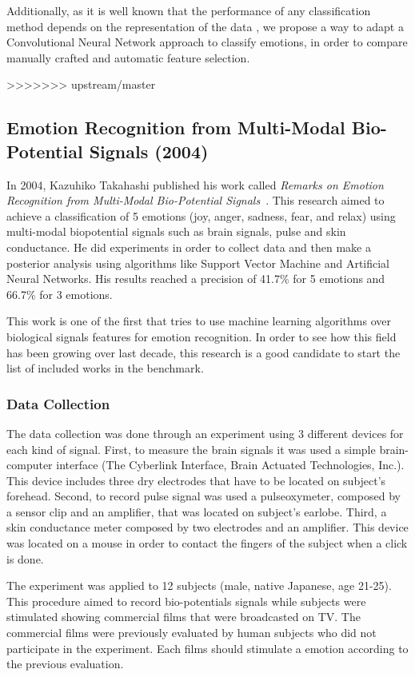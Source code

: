\documentclass{sig-alternate}
\begin{document}
Additionally, as it is well known that the performance of any 
classification method depends on the representation of the data 
\cite{bengio2013representation}, 
we propose a way to adapt a Convolutional Neural 
Network approach to classify emotions, in order to compare  manually
crafted and automatic feature selection. 

>>>>>>> upstream/master
\subsection{Emotion Recognition from Multi-Modal Bio-Potential Signals (2004)}	

In 2004, Kazuhiko Takahashi published his work called 
\textit{Remarks on Emotion Recognition from Multi-Modal Bio-Potential Signals}~\cite{takahashi2004}. This 
research aimed to achieve a classification of 5 emotions (joy, anger, sadness, fear, and relax)
using multi-modal biopotential signals such as brain signals, pulse and skin conductance. He
 did experiments in order to collect data and then make a posterior analysis using algorithms
 like Support Vector Machine and Artificial Neural Networks. His results reached a precision of
 41.7\% for 5 emotions and 66.7\% for 3 emotions. 

This work is one of the first that tries to use machine learning algorithms
 over biological signals features for emotion recognition. In order to see
 how this field has been growing over last decade, this research is a good
 candidate to start the list of included works in the benchmark.  

\subsubsection{Data Collection}

The data collection was done through an experiment using 3 different devices for each kind of signal. 
First, to measure the brain signals it was used a simple brain-computer interface
(The Cyberlink Interface, Brain Actuated Technologies, Inc.). This device includes 
three dry electrodes that have to be located on subject's forehead. Second, to record 
pulse signal was used a pulseoxymeter, composed by a sensor clip and an amplifier, that 
was located on subject's earlobe. Third, a skin conductance meter composed by
two electrodes and an amplifier. This device was located on a mouse in order to 
contact the fingers of the subject when a click is done. 

The experiment was applied to 12 subjects (male, native Japanese, age 21-25). This
procedure aimed to record bio-potentials signals while subjects were stimulated showing commercial 
films that were broadcasted on TV. The commercial films were previously evaluated by 
human subjects who did not participate in the experiment. Each films should stimulate a 
emotion according to the previous evaluation.         
\end{document}
